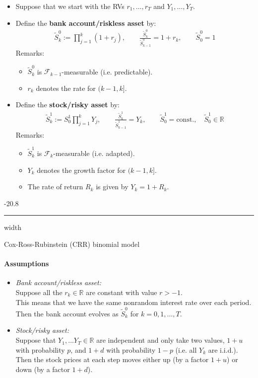 \documentclass[a4paper,landscape,8pt,fleqn]{scrartcl}
\makeatletter
\renewcommand{\emph}[1]{\textbf{#1}}
\renewcommand{\subsubsection}{\@startsection{subsubsection}{1}{0mm}%
{-2\baselineskip}{0.8\baselineskip}%
{\hrule depth 0.2pt width\columnwidth\vspace*{1.2em}\normalsize\bfseries}}
\makeatother
\begin{document}
\begin{multicols*}{3}
\begin{itemize}
\item Suppose that we start with the RVs $r_1, \ldots, r_T$ and $Y_1, \ldots, Y_T$.
\item Define the \emph{bank account/riskless asset} by:
\begin{align*}
\tilde S_k^0 := \prod_{j=1}^k (1+r_j), \qquad \frac{\tilde S_k^0}{\tilde S_{k-1}^0} = 1 + r_k, \qquad \tilde S_0^0 = 1
\end{align*}
Remarks:
\begin{itemize}
\item $\tilde S_k^0$ is $\mathcal{F}_{k-1}$-measurable (i.e. predictable).
\item $r_k$ denotes the rate for $(k-1,k]$.
\end{itemize}
\item Define the \emph{stock/risky asset} by:
\begin{align*}
\tilde S_k^1 := S_0^1 \prod_{j=1}^k Y_j, \qquad \frac{\tilde S_k^1}{\tilde S_{k-1}^1} = Y_k, \qquad \tilde S_0^1 = \text{const.}, \quad \tilde S_0^1 \in \mathbb{R}
\end{align*}
Remarks:
\begin{itemize}
\item $\tilde S_k^1$ is $\mathcal{F}_k$-measurable (i.e. adapted).
\item $Y_k$ denotes the growth factor for $(k-1,k]$.
\item The rate of return $R_k$ is given by $Y_k = 1 + R_k$.
\end{itemize}
\end{itemize}

\subsubsection{Cox-Ross-Rubinstein (CRR) binomial model}

\paragraph{Assumptions}
\begin{itemize}
\item \textit{Bank account/riskless asset:} \\
Suppose all the $r_k \in \mathbb{R}$ are constant with value $r > -1$. \\
This means that we have the same nonrandom interest rate over each period. \\
Then the bank account evolves as $\tilde S_k^0$ for $k=0,1, \ldots, T$.
\item \textit{Stock/risky asset:} \\
Suppose that $Y_1, \ldots Y_T \in \mathbb{R}$ are independent and only take two values, $1+u$ with probability $p$, and $1+d$ with probability $1-p$ (i.e. all $Y_k$ are i.i.d.). \\
Then the stock prices at each step moves either up (by a factor $1+u$) or down (by a factor $1+d$).
\end{itemize}


\end{multicols*}
\end{document}
